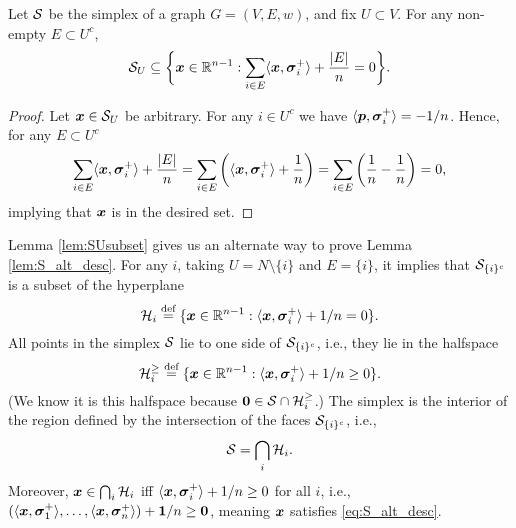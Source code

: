 \begin{lemma}
\label{lem:SUsubset}
Let $\mathcal{S}$ be the simplex of a graph $G=(V,E,w)$, and fix $U\subset V$. For any non-empty $E\subset U^c$,
\begin{equation*}
    \mathcal{S}_U \subseteq \bigg\{\vb*{x}\in\mathbb{R}^{n-1}: \sum_{i\in E}\langle \vb*{x},\vb*{\sigma}_i^+\rangle +\frac{|E|}{n}=  0\bigg\}.
\end{equation*}
\end{lemma}
\begin{proof}
Let $\vb*{x}\in\mathcal{S}_U$ be arbitrary. For any $i\in U^c$ we have $\langle \vb*{p},\vb*{\sigma}_i^+\rangle = -1/n$. Hence, for any $E\subset U^c$
\[\sum_{i\in E}\langle \vb*{x},\vb*{\sigma}_i^+\rangle + \frac{|E|}{n} = \sum_{i\in E}\bigg(\langle \vb*{x},\vb*{\sigma}_i^+\rangle+\frac{1}{n}\bigg)=\sum_{i\in E}\bigg(\frac{1}{n}-\frac{1}{n}\bigg)=0,\]
implying that $\vb*{x}$ is in the desired set. 
\end{proof}

Lemma \ref{lem:SUsubset} gives us an alternate way to prove Lemma \ref{lem:S_alt_desc}. For any $i$,  taking $U=N\setminus \{i\}$ and $E=\{i\}$, it implies that $\mathcal{S}_{\{i\}^c}$ is a subset of the hyperplane 
\[ \mathcal{H}_i\overset{\text{def}}{=} \{\vb*{x}\in\mathbb{R}^{n-1}:\langle \vb*{x},\vb*{\sigma}_i^+\rangle+1/n=0\}.\]
All points in the simplex $\mathcal{S}$ lie to one side of $\mathcal{S}_{\{i\}^c}$, i.e., they lie in the halfspace 
\[\mathcal{H}_i^{\geq } \overset{\text{def}}{=} \{\vb*{x}\in\mathbb{R}^{n-1}:\langle \vb*{x},\vb*{\sigma}_i^+\rangle+1/n\geq0\}.\]
(We know it is this halfspace because $\vb{0}\in\mathcal{S}\cap\mathcal{H}_i^{\geq }$.) The simplex is the interior of the region defined by the intersection of the faces $\mathcal{S}_{\{i\}^c}$, i.e.,   
\begin{equation*}
    \mathcal{S}=\bigcap_i \mathcal{H}_i.
\end{equation*}
Moreover, $\vb*{x}\in \bigcap_i\mathcal{H}_i$ iff $\langle \vb*{x},\vb*{\sigma}_i^+\rangle +1/n\geq 0$ for all $i$, i.e., $(\langle \vb*{x},\vb*{\sigma}_1^+\rangle,\dots,\langle \vb*{x},\vb*{\sigma}_n^+\rangle) + \vb{1}/n\geq \vb{0}$, meaning $\vb*{x}$ satisfies \eqref{eq:S_alt_desc}.  






